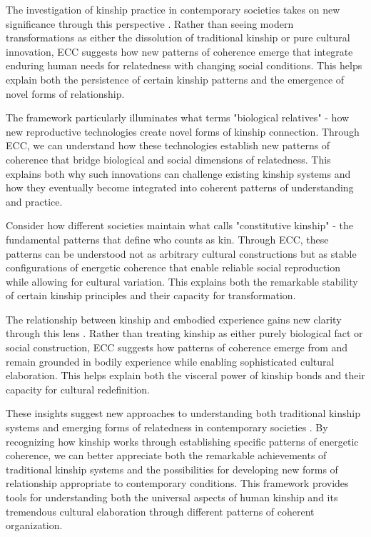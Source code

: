 The investigation of kinship practice in contemporary societies takes on new significance through this perspective \cite{carsten2004after}. Rather than seeing modern transformations as either the dissolution of traditional kinship or pure cultural innovation, ECC suggests how new patterns of coherence emerge that integrate enduring human needs for relatedness with changing social conditions. This helps explain both the persistence of certain kinship patterns and the emergence of novel forms of relationship.

The framework particularly illuminates what \cite{franklin2013biological} terms "biological relatives" - how new reproductive technologies create novel forms of kinship connection. Through ECC, we can understand how these technologies establish new patterns of coherence that bridge biological and social dimensions of relatedness. This explains both why such innovations can challenge existing kinship systems and how they eventually become integrated into coherent patterns of understanding and practice.

Consider how different societies maintain what \cite{sahlins2013what} calls "constitutive kinship" - the fundamental patterns that define who counts as kin. Through ECC, these patterns can be understood not as arbitrary cultural constructions but as stable configurations of energetic coherence that enable reliable social reproduction while allowing for cultural variation. This explains both the remarkable stability of certain kinship principles and their capacity for transformation.

The relationship between kinship and embodied experience gains new clarity through this lens \cite{strathern1992after}. Rather than treating kinship as either purely biological fact or social construction, ECC suggests how patterns of coherence emerge from and remain grounded in bodily experience while enabling sophisticated cultural elaboration. This helps explain both the visceral power of kinship bonds and their capacity for cultural redefinition.

These insights suggest new approaches to understanding both traditional kinship systems and emerging forms of relatedness in contemporary societies \cite{carsten2000cultures}. By recognizing how kinship works through establishing specific patterns of energetic coherence, we can better appreciate both the remarkable achievements of traditional kinship systems and the possibilities for developing new forms of relationship appropriate to contemporary conditions. This framework provides tools for understanding both the universal aspects of human kinship and its tremendous cultural elaboration through different patterns of coherent organization.